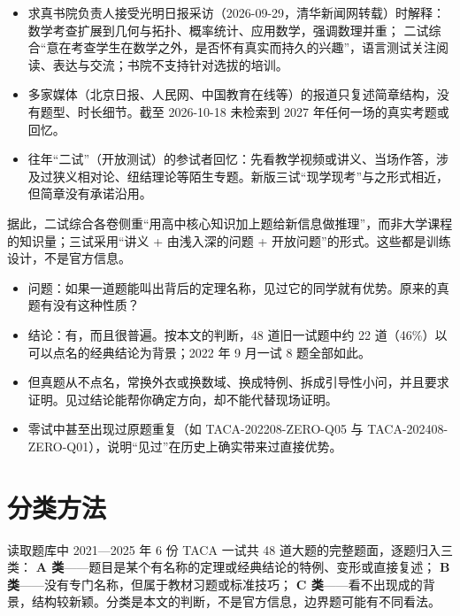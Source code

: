 \documentclass[cjk=noto, nomargin]{mojing-notes}
\begin{document}
\begin{itemize}
  \item 求真书院负责人接受光明日报采访（2026-09-29，清华新闻网转载）时解释：数学考查扩展到几何与拓扑、概率统计、应用数学，强调数理并重；
        二试综合“意在考查学生在数学之外，是否怀有真实而持久的兴趣”，语言测试关注阅读、表达与交流；书院不支持针对选拔的培训。
  \item 多家媒体（北京日报、人民网、中国教育在线等）的报道只复述简章结构，没有题型、时长细节。截至 2026-10-18 未检索到 2027 年任何一场的真实考题或回忆。
  \item 往年“二试”（开放测试）的参试者回忆：先看教学视频或讲义、当场作答，涉及过狭义相对论、纽结理论等陌生专题。新版三试“现学现考”与之形式相近，但简章没有承诺沿用。
\end{itemize}
据此，二试综合各卷侧重“用高中核心知识加上题给新信息做推理”，而非大学课程的知识量；三试采用“讲义 + 由浅入深的问题 + 开放问题”的形式。这些都是训练设计，不是官方信息。


\begin{keypoints}
\begin{itemize}
  \item 问题：如果一道题能叫出背后的定理名称，见过它的同学就有优势。原来的真题有没有这种性质？
  \item 结论：有，而且很普遍。按本文的判断，48 道旧一试题中约 22 道（46\%）以可以点名的经典结论为背景；2022 年 9 月一试 8 题全部如此。
  \item 但真题从不点名，常换外衣或换数域、换成特例、拆成引导性小问，并且要求证明。见过结论能帮你确定方向，却不能代替现场证明。
  \item 零试中甚至出现过原题重复（如 TACA-202208-ZERO-Q05 与 TACA-202408-ZERO-Q01），说明“见过”在历史上确实带来过直接优势。
\end{itemize}
\end{keypoints}

\section{分类方法}

读取题库中 2021—2025 年 6 份 TACA 一试共 48 道大题的完整题面，逐题归入三类：
\textbf{A 类}——题目是某个有名称的定理或经典结论的特例、变形或直接复述；
\textbf{B 类}——没有专门名称，但属于教材习题或标准技巧；
\textbf{C 类}——看不出现成的背景，结构较新颖。分类是本文的判断，不是官方信息，边界题可能有不同看法。
\end{document}

